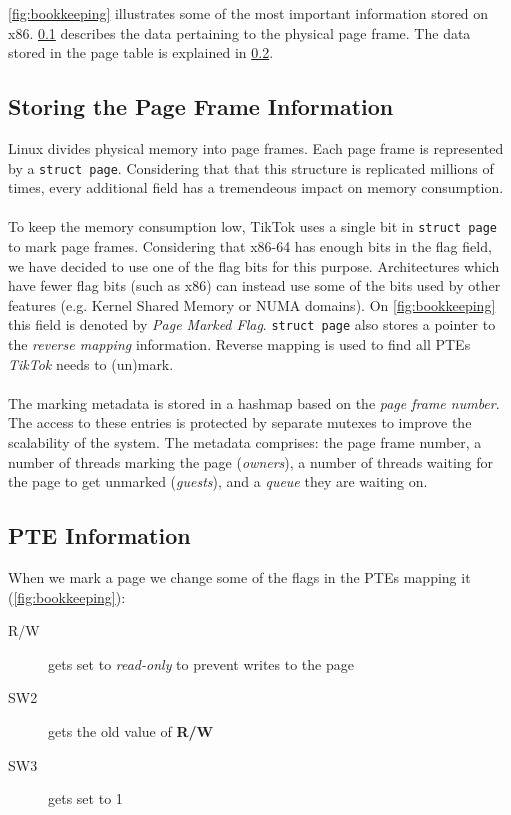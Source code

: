 \cref{fig:bookkeeping} illustrates some of the most important information stored on x86. \cref{subsec:frameinfo} describes the data pertaining to
the physical page frame. The data stored in the page table is explained in \cref{subsec:pageinfo}.

\subsection{Storing the Page Frame Information}
\label{subsec:frameinfo}
Linux divides physical memory into page frames. Each page frame is represented by a \texttt{struct page}. Considering that that this structure
is replicated millions of times, every additional field has a tremendeous impact on memory consumption.
\\
\\
To keep the memory consumption low, TikTok uses a single bit in \texttt{struct page} to mark page frames. Considering that x86-64 has enough bits in the flag field,
we have decided to use one of the flag bits for this purpose. Architectures which have fewer flag bits (such as x86) can instead use some of
the bits used by other features (e.g. Kernel Shared Memory or NUMA domains). On \cref{fig:bookkeeping} this field is denoted by \emph{Page Marked Flag}.
\texttt{struct page} also stores a pointer to the \emph{reverse mapping} information. Reverse mapping is used to find all PTEs \emph{TikTok} needs to (un)mark.
\\
\\
The marking metadata is stored in a hashmap based on the \emph{page frame number}. The access to these entries is protected by separate mutexes to improve the
scalability of the system. The metadata comprises: the page frame number, a number of threads marking the page (\emph{owners}), a number of threads waiting for
the page to get unmarked (\emph{guests}), and a \emph{queue} they are waiting on. 

\subsection{PTE Information}
\label{subsec:pageinfo}

When we mark a page we change some of the flags in the PTEs mapping it (\cref{fig:bookkeeping}):

\begin{description}
  \item[R/W] gets set to \emph{read-only} to prevent writes to the page
  \item[SW2] gets the old value of \textbf{R/W}
  \item[SW3] gets set to 1 
\end{description}

